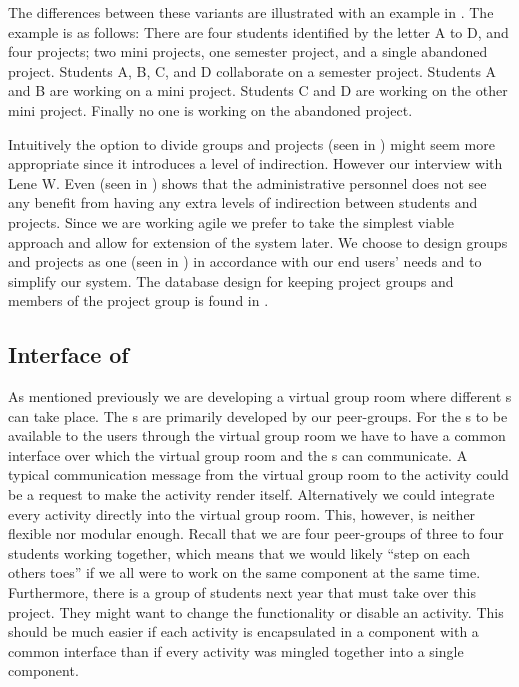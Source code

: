 The differences between these variants are illustrated with an example in .
The example is as follows:
There are four students identified by the letter A to D, and four projects; two mini projects, one semester project, and a single abandoned project.
Students A, B, C, and D collaborate on a semester project.
Students A and B are working on a mini project.
Students C and D are working on the other mini project.
Finally no one is working on the abandoned project.

Intuitively the option to divide groups and projects (seen in ) might seem more appropriate since it introduces a level of indirection.
However our interview with Lene W. Even (seen in ) shows that the administrative personnel does not see any benefit from having any extra levels of indirection between students and projects.
Since we are working agile we prefer to take the simplest viable approach and allow for extension of the system later.
We choose to design groups and projects as one (seen in ) in accordance with our end users' needs and to simplify our system.
The database design for keeping project groups and members of the project group is found in .

\subsection{Interface of \detdeandrelaver[c]}
\label{sub:interActivities}
As mentioned previously we are developing a virtual group room where different \detdeandrelaver[]s can take place.
The \detdeandrelaver[]s are primarily developed by our peer-groups.
For the \detdeandrelaver[]s to be available to the users through the virtual group room we have to have a common interface over which the virtual group room and the \detdeandrelaver[]s can communicate.
A typical communication message from the virtual group room to the activity could be a request to make the activity render itself.
Alternatively we could integrate every activity directly into the virtual group room.
This, however, is neither flexible nor modular enough.
Recall that we are four peer-groups of three to four students working together, which means that we would likely ``step on each others toes'' if we all were to work on the same component at the same time.
Furthermore, there is a group of students next year that must take over this project.
They might want to change the functionality or disable an activity.
This should be much easier if each activity is encapsulated in a component with a common interface than if every activity was mingled together into a single component.


